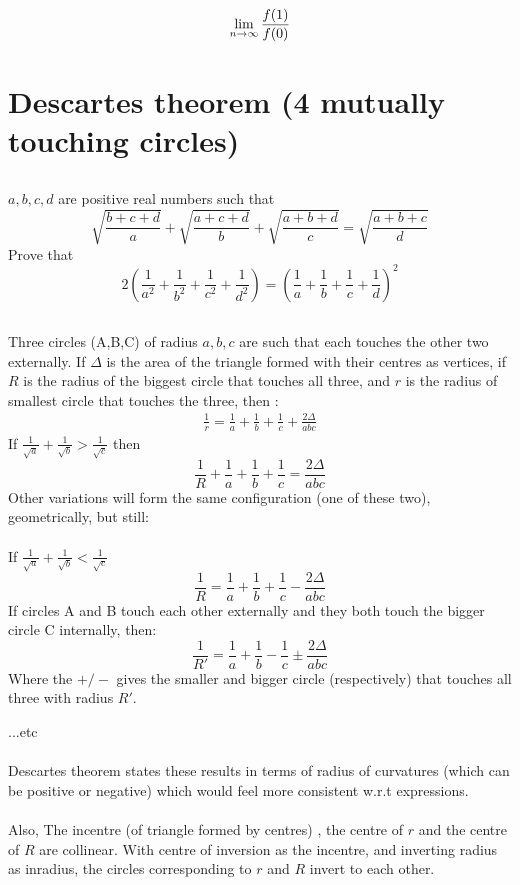 \documentclass{article}
\begin{document}
$$\lim_{n\rightarrow \infty} {{f(1)}\over {f(0)}}$$

\section{Descartes theorem (4 mutually touching circles)}
\subsection{}
$a,b,c,d$ are positive real numbers such that
$$\sqrt{\frac{b+c+d}{a}} + \sqrt{\frac{a+c+d}{b}} + \sqrt{\frac{a+b+d}{c}}  = \sqrt{\frac{a+b+c}{d}} $$
Prove that
$$2\left(\frac{1}{a^2} + \frac{1}{b^2} + \frac{1}{c^2} + \frac{1}{d^2}\right) = \left(\frac{1}{a} + \frac{1}{b} + \frac{1}{c} + \frac{1}{d}\right)^2$$

\subsection{}
Three circles (A,B,C) of radius $a,b,c$ are such that each touches the other two externally. If $\Delta$ is the area of the triangle formed with their centres as vertices, if $R$ is the radius of the biggest circle that touches all three, and $r$ is the radius of smallest circle that touches the three, then :
\begin{align*}
    \frac{1}{r} = \frac{1}{a} + \frac{1}{b} + \frac{1}{c} + \frac{2\Delta}{abc}
\end{align*}
If $\frac {1}{\sqrt a} + \frac {1}{\sqrt b} > \frac {1}{\sqrt c}$ then
$$\frac {1}{R} + \frac {1}{a} + \frac {1}{b} + \frac {1}{c} = \frac {2 \Delta}{abc}$$
Other variations will form the same configuration (one of these two), geometrically, but still:
\\\\
If $\frac {1}{\sqrt a} + \frac {1}{\sqrt b} < \frac {1}{\sqrt c}$ $$\frac {1}{R} = \frac {1}{a} + \frac {1}{b} + \frac {1}{c} - \frac {2 \Delta}{abc}$$
If circles A and B touch each other externally and they both touch the bigger circle C internally, then:
$$\frac {1}{R'} = \frac {1}{a} + \frac {1}{b} - \frac {1}{c} \pm  \frac {2 \Delta }{abc}$$
Where the $+/-$ gives the smaller and bigger circle (respectively) that touches all three with radius $R'$.

...etc
\\\\
Descartes theorem states these results in terms of radius of curvatures (which can be positive or negative) which would feel more consistent w.r.t expressions.
\\\\
Also, The incentre (of triangle formed by centres) , the centre of $r$ and the centre of $R$ are collinear. With centre of inversion as the incentre, and inverting radius as inradius, the circles corresponding to $r$ and $R$ invert to each other.
\end{document}
